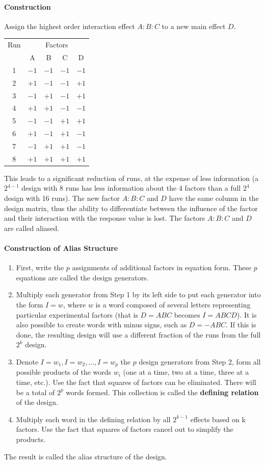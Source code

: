 \documentclass[11pt]{article}
\theoremstyle{definition}
\begin{document}
\paragraph{Construction} Assign the highest order interaction effect $A:B:C$ to a new main effect $D$. 
\begin{tabularx}{\linewidth}{c | c c c | c}
	Run & \multicolumn{4}{c}{Factors} \\
	& A & B & C & D \\
	\hline
	1 & $-1$ & $-1$ & $-1$ & $-1$ \\
	2 & $+1$ & $-1$ & $-1$ & $+1$ \\
	3 & $-1$ & $+1$ & $-1$ & $+1$ \\
	4 & $+1$ & $+1$ & $-1$ & $-1$ \\
	5 & $-1$ & $-1$ & $+1$ & $+1$ \\
	6 & $+1$ & $-1$ & $+1$ & $-1$ \\
	7 & $-1$ & $+1$ & $+1$ & $-1$ \\
	8 & $+1$ & $+1$ & $+1$ & $+1$ \\
\end{tabularx}
This leads to a significant reduction of runs, at the expense of less information (a $2^{4-1}$ design with 8 runs has less information about the 4 factors than a full $2^4$ design with 16 runs). The new factor $A:B:C$ and $D$ have the same column in the design matrix, thus the ability to differentiate between the influence of the factor and their interaction with the response value is lost. The factors $A:B:C$ and $D$ are called aliased.

\paragraph{Construction of Alias Structure}
\begin{enumerate}
	\item First, write the $p$ assignments of additional factors in equation form. These $p$ equations are called the design generators.
	\item Multiply each generator from Step 1 by its left side to put each generator into the form $I = w$, where $w$ is a word composed of several letters representing particular experimental factors (that is $D = ABC$ becomes $I = ABCD$). It is also possible to create words with minus signs, such as $D = −ABC$. If this is done, the resulting design will use a different fraction of the runs from the full $2^k$ design.
	\item  Denote $I = w_1, I = w_2,\dots,I = w_p$ the $p$ design generators from Step 2, form all possible products of the words $w_i$ (one at a time, two at a time, three at a time, etc.). Use the fact that squares of factors can be eliminated. There will be a total of $2^p$ words formed. This collection is called the \textbf{defining relation} of the design.
	\item Multiply each word in the defining relation by all $2^{k − 1}$ effects based on k factors. Use the fact that squares of factors cancel out to simplify the products.
\end{enumerate}
The result is called the alias structure of the design.
\end{document}

